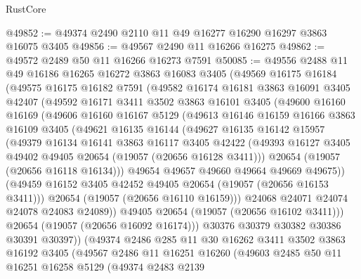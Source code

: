 \begin{lexlean}{RustCore}
\begin{coremodule}
@49852 := @49374 @2490 @2110 @11 @49 @16277 @16290 @16297 @3863 @16075 @3405
@49856 := @49567 @2490 @11 @16266 @16275
@49862 := @49572 @2489 @50 @11 @16266 @16273 @7591
@50085 := @49556
    @2488
    @11
    @49
    @16186
    @16265
    @16272
    @3863
    @16083
    @3405
    (@49569
      @16175
      @16184
      (@49575
        @16175
        @16182
        @7591
        (@49582
          @16174
          @16181
          @3863
          @16091
          @3405
          @42407
          (@49592
            @16171
            @3411
            @3502
            @3863
            @16101
            @3405
            (@49600
              @16160
              @16169
              (@49606
                @16160
                @16167
                @5129
                (@49613
                  @16146
                  @16159
                  @16166
                  @3863
                  @16109
                  @3405
                  (@49621
                    @16135
                    @16144
                    (@49627
                      @16135
                      @16142
                      @15957
                      (@49379
                        @16134
                        @16141
                        @3863
                        @16117
                        @3405
                        @42422
                        (@49393 @16127 @3405 @49402 @49405 @20654 (@19057 (@20656 @16128 @3411)))
                        @20654
                        (@19057 (@20656 @16118 @16134)))
                      @49654
                      @49657
                      @49660
                      @49664
                      @49669
                      @49675))
                  (@49459 @16152 @3405 @42452 @49405 @20654 (@19057 (@20656 @16153 @3411)))
                  @20654
                  (@19057 (@20656 @16110 @16159)))
                @24068
                @24071
                @24074
                @24078
                @24083
                @24089))
            @49405
            @20654
            (@19057 (@20656 @16102 @3411)))
          @20654
          (@19057 (@20656 @16092 @16174)))
        @30376
        @30379
        @30382
        @30386
        @30391
        @30397))
    (@49374
      @2486
      @285
      @11
      @30
      @16262
      @3411
      @3502
      @3863
      @16192
      @3405
      (@49567
        @2486
        @11
        @16251
        @16260
        (@49603
          @2485
          @50
          @11
          @16251
          @16258
          @5129
          (@49374
            @2483
            @2139

\end{coremodule}
\end{lexlean}
